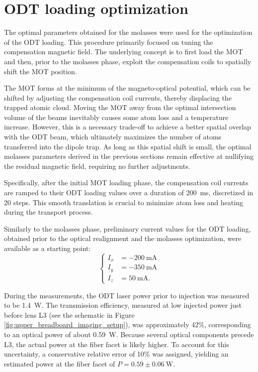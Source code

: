 \section{ODT loading optimization}
The optimal parameters obtained for the molasses were used for the optimization of the ODT loading. This procedure primarily focused on tuning the compensation magnetic field. The underlying concept is to first load the MOT and then, prior to the molasses phase, exploit the compensation coils to spatially shift the MOT position.

The MOT forms at the minimum of the magneto-optical potential, which can be shifted by adjusting the compensation coil currents, thereby displacing the trapped atomic cloud.
Moving the MOT away from the optimal intersection volume of the beams inevitably causes some atom loss and a temperature increase. However, this is a necessary trade-off to achieve a better spatial overlap with the ODT beam, which ultimately maximizes the number of atoms transferred into the dipole trap. As long as this spatial shift is small, the optimal molasses parameters derived in the previous sections remain effective at nullifying the residual magnetic field, requiring no further adjustments.

Specifically, after the initial MOT loading phase, the compensation coil currents are ramped to their ODT loading values over a duration of 200~ms, discretized in 20 steps. This smooth translation is crucial to minimize atom loss and heating during the transport process.

Similarly to the molasses phase, preliminary current values for the ODT loading, obtained prior to the optical realignment and the molasses optimization, were available as a starting point:
\begin{equation}
    \begin{cases}
        I_{x} &= -200~\mathrm{mA} \\
        I_{y} &= -350~\mathrm{mA} \\
        I_{z} &= 50~\mathrm{mA}.
    \end{cases}
    \label{eq:shim_shifted_MOT_preliminary}
\end{equation}

During the measurements, the ODT laser power prior to injection was measured to be 1.4~W. The transmission efficiency, measured at low injected power just before lens L3 (see the schematic in Figure \ref{fig:upper_breadboard_imaging_setup}), was approximately 42\%, corresponding to an optical power of about 0.59~W. Because several optical components precede L3, the actual power at the fiber facet is likely higher. To account for this uncertainty, a conservative relative error of 10\% was assigned, yielding an estimated power at the fiber facet of $P = 0.59 \pm 0.06~\text{W}$.

